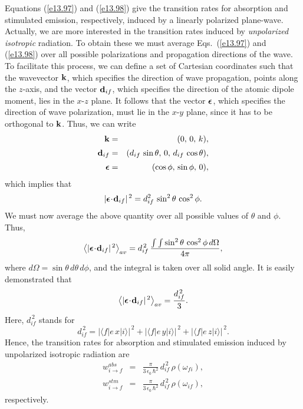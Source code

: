 Equations (\ref{e13.97}) and (\ref{e13.98}) give the transition rates
for absorption and stimulated emission, respectively, induced by
a linearly polarized plane-wave. Actually, we are more interested in the
transition rates induced by {\em unpolarized isotropic}\/ radiation. To obtain
these we must average Eqs.~(\ref{e13.97}) and (\ref{e13.98})
over all possible polarizations and propagation directions of the wave.
To facilitate this process, we can define a set of Cartesian coordinates
such that the wavevector ${\bf k}$, which specifies the direction
of wave propagation, points along the $z$-axis,  and the vector ${\bf d}_{if}$,
which specifies the direction of the atomic dipole moment, lies
in the $x$-$z$ plane. It follows that the vector $\mbox{\boldmath$\epsilon$}$, which
specifies the direction of wave polarization, must lie
in the $x$-$y$ plane, since it has to be orthogonal to ${\bf k}$. 
Thus, we can write
\begin{eqnarray}
{\bf k} &=& (0,\,0,\,k),\\[0.5ex]
{\bf d}_{if} &=& (d_{if}\,\sin\theta,\,0,\,d_{if}\,\cos\theta),\\[0.5ex]
\mbox{\boldmath$\epsilon$} &=& (\cos\phi,\, \sin\phi,\,0),
\end{eqnarray}
which implies that
\begin{equation}
|\mbox{\boldmath$\epsilon$}\!\cdot\!{\bf d}_{if}|^{\,2} = d_{if}^2\,\sin^2\theta\,\cos^2\phi.
\end{equation}
We must now average the above quantity over all possible values of
$\theta$ and $\phi$. Thus,
\begin{equation}
\left\langle |\mbox{\boldmath$\epsilon$}\!\cdot\!{\bf d}_{if}|^{\,2}\right\rangle_{av}= d^{\,2}_{if}\,
\frac{\int\int\sin^2\theta\,\cos^2\phi\,d\Omega}{4\pi},
\end{equation}
where $d\Omega = \sin\theta\,d\theta\,d\phi$, and the integral is taken over all
solid angle. It is easily demonstrated that
\begin{equation}
\left\langle |\mbox{\boldmath$\epsilon$}\!\cdot\!{\bf d}_{if}|^{\,2}\right\rangle_{av} = \frac{d_{if}^{\,2}}{3}.
\end{equation}
Here, $d^{\,2}_{if}$ stands for
\begin{equation}\label{e3.106}
d^{\,2}_{if} = |\langle f|e\,x|i\rangle|^{\,2}+|\langle f|e\,y|i\rangle|^{\,2}+ |\langle f|e\,z|i\rangle|^{\,2}.
\end{equation}
Hence, the transition rates
for absorption and stimulated emission induced by
unpolarized isotropic radiation are
\begin{eqnarray}\label{e13.107}
w_{i\rightarrow f}^{abs} &=& \frac{\pi}{3\,\epsilon_0\,\hbar^2}\,d^{\,2}_{if}\,\rho(\omega_{fi}),\\[0.5ex]
w_{i\rightarrow f}^{stm} &=& \frac{\pi}{3\,\epsilon_0\,\hbar^2}\,d^{\,2}_{if}\,\rho(\omega_{if}),\label{e13.108}
\end{eqnarray}
respectively.

